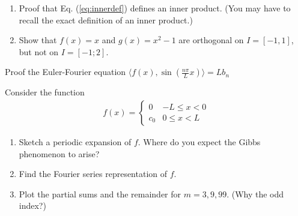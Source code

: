\begin{exerciseregion}
	\begin{exercise}
		\begin{enumerate}
			\item Proof that Eq. (\ref{eq:innerdef}) defines an inner product. (You may have 
				to recall the exact definition of an inner product.) 
			\item Show that $f(x) = x$ and $g(x)=x^2 - 1$ are orthogonal on $I=[-1,1]$, but not on $I=[-1;2]$. 
		\end{enumerate}		
	\end{exercise}

	\begin{exercise}
		Proof the Euler-Fourier equation $ \langle f(x),
		\sin\left(\frac{n\pi}{L}x\right)\rangle = Lb_n$
	\end{exercise}
		
	\begin{exercise}
		Consider the function
		\begin{eqnarray}
			f(x) = 
			\begin{cases} 
			      0 & -L \leq x < 0 \\
				  c_0 & 0 \leq x < L
   			\end{cases}
		\end{eqnarray}
		\begin{enumerate}
			\item Sketch a periodic expansion of $f$.  Where do you expect the
				Gibbs phenomenon to arise?
			\item Find the Fourier series representation of $f$.
			\item Plot the partial sums and the remainder for $m=3,9,99$. (Why the odd index?)
		\end{enumerate}			
	\end{exercise}


\end{exerciseregion}
